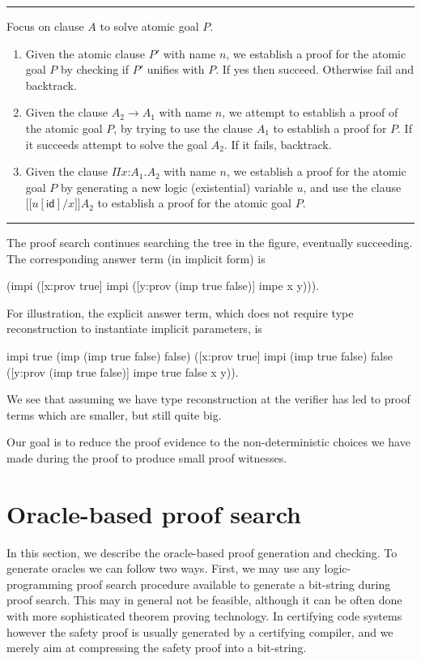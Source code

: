 \documentclass{acmconf}
\newcommand{\figfoot}{\vspace{1ex}\hrule}
\newcommand{\fighead}{\hrule\vspace{1.5ex}}
\newcommand{\arrow}{\rightarrow}
\newcommand{\oftp}{\mathord{:}}
\newcommand{\lbb}{{[\![}}
\newcommand{\rbb}{{]\!]}}
\newcommand{\id}{\mathsf{id}}
\newcommand{\msub}[1]{\lbb #1 \rbb}
\begin{document}
\fighead
\begin{small}
Focus on clause $A$ to solve atomic goal $P$.
\begin{enumerate}
\item Given the atomic clause $P'$ with name $n$, we establish a proof for the
  atomic goal $P$ by checking if $P'$ unifies with $P$. If yes then
  succeed. Otherwise fail and backtrack. 
\item Given the clause $A_2 \arrow A_1$ with name $n$, we attempt to establish a
  proof of the atomic goal $P$, by trying to use the clause $A_1$ to
  establish a proof for $P$. If it succeeds attempt to solve the goal
  $A_2$. If it fails,  backtrack. 
\item Given the clause $\Pi x\oftp A_1. A_2$ with name $n$, we
  establish a proof for the atomic goal $P$ by generating a new logic
  (existential) variable $u$, and use the clause $\msub{u[\id]/x}A_2$
  to establish a proof for the atomic goal $P$. 
\end{enumerate}
\end{small}
\figfoot

The proof search continues searching the tree in the figure, eventually 
succeeding. The corresponding answer term (in implicit form) is 
\begin{code}
(impi ([x:prov true] impi 
       ([y:prov (imp true false)] impe x y))).
\end{code}

For illustration, the explicit answer term, which does not require type
reconstruction to instantiate implicit parameters, is 
\begin{code}
impi true (imp (imp true false) false)
    ([x:prov true]
        impi (imp true false) false
            ([y:prov (imp true false)] 
                impe true false x y)).
\end{code}

We see that assuming we have type reconstruction at the verifier has
led to proof terms which are smaller, but still quite big.

Our goal is to reduce the proof evidence to the non-deterministic
choices we have made during the proof to produce small proof witnesses. 
      
\section{Oracle-based proof search}
\label{sec:oracles}

In this section, we describe the oracle-based proof generation and
checking. To generate oracles we can follow two ways. First, we may
use any logic-programming proof search procedure available to generate
a bit-string during proof search. This may in general not be feasible,
although it can be often done with more sophisticated theorem proving
technology. In certifying code systems however the safety proof is
usually generated by a certifying compiler, and we merely aim at
compressing the safety proof into a bit-string.
\end{document}
